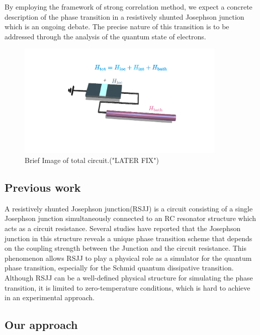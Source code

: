 \documentclass{article}[12pt]
\begin{document}
\begin{spacing}{1.5}
By employing the framework of strong correlation method, we expect a concrete description of the phase transition in a resistively shunted Josephson junction which is an ongoing debate. The precise nature of this transition is to be addressed through the analysis of the quantum state of electrons.
\begin{figure}[htbp]
  \centerline{\includegraphics[width=10cm]{TexFigure/kps_create_junction.png}}
  \caption{Brief Image of total circuit.("LATER FIX")}
\end{figure}

\pagebreak
\subsection*{Previous work}

A resistively shunted Josephson junction(RSJJ) is a circuit consisting of a single Josephson junction simultaneously connected to an RC resonator structure which acts as a circuit resistance. Several studies have reported that the Josephson junction in this structure reveals a unique phase transition scheme that depends on the coupling strength between the Junction and the circuit resistance. This phenomenon allows RSJJ to play a physical role as a simulator for the quantum phase transition, especially for the Schmid quantum dissipative transition. Although RSJJ can be a well-defined physical structure for simulating the phase transition, it is limited to zero-temperature conditions, which is hard to achieve in an experimental approach.

\subsection*{Our approach}


\end{spacing}
\end{document}
